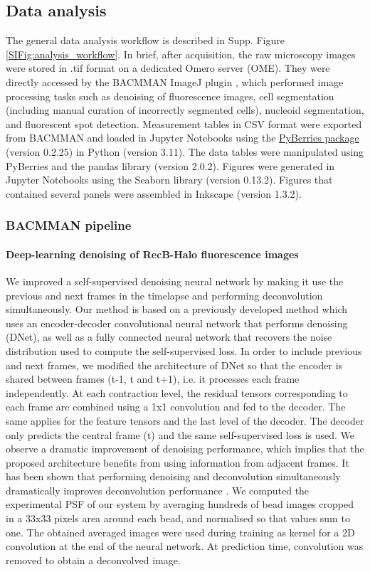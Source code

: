 \subsection*{Data analysis}
The general data analysis workflow is described in Supp. Figure \ref{SIFig:analysis_workflow}. In brief, after acquisition, the raw microscopy images were stored in .tif format on a dedicated Omero server (OME). They were directly accessed by the BACMMAN ImageJ plugin \cite{Ollion2019}, which performed image processing tasks such as denoising of fluorescence images, cell segmentation (including manual curation of incorrectly segmented cells), nucleoid segmentation, and fluorescent spot detection. Measurement tables in CSV format were exported from BACMMAN and loaded in Jupyter Notebooks using the \href{https://gitlab.com/MEKlab/pyberries}{PyBerries package} (version 0.2.25) in Python (version 3.11). The data tables were manipulated using PyBerries and the pandas library (version 2.0.2). Figures were generated in Jupyter Notebooks using the Seaborn library (version 0.13.2). Figures that contained several panels were assembled in Inkscape (version 1.3.2).

\subsubsection*{BACMMAN pipeline}
\paragraph*{Deep-learning denoising of RecB-Halo fluorescence images}
We improved a self-supervised denoising neural network by making it use the previous and next frames in the timelapse and performing deconvolution simultaneously. Our method is based on a previously developed method \cite{Ollion2021} which uses an encoder-decoder convolutional neural network that performs denoising (DNet), as well as a fully connected neural network that recovers the noise distribution used to compute the self-supervised loss. In order to include previous and next frames, we modified the architecture of DNet so that the encoder is shared between frames (t-1, t and t+1), i.e. it processes each frame independently. At each contraction level, the residual tensors corresponding to each frame are combined using a 1x1 convolution and fed to the decoder. The same applies for the feature tensors and the last level of the decoder. The decoder only predicts the central frame (t) and the same self-supervised loss is used. We observe a dramatic improvement of denoising performance, which implies that the proposed architecture benefits from using information from adjacent frames. It has been shown that performing denoising and deconvolution simultaneously dramatically improves deconvolution performance \cite{Kobayashi2020}. We computed the experimental PSF of our system by averaging hundreds of bead images cropped in a 33x33 pixels area around each bead, and normalised so that values sum to one. The obtained averaged images were used during training as kernel for a 2D convolution at the end of the neural network. At prediction time, convolution was removed to obtain a deconvolved image.

